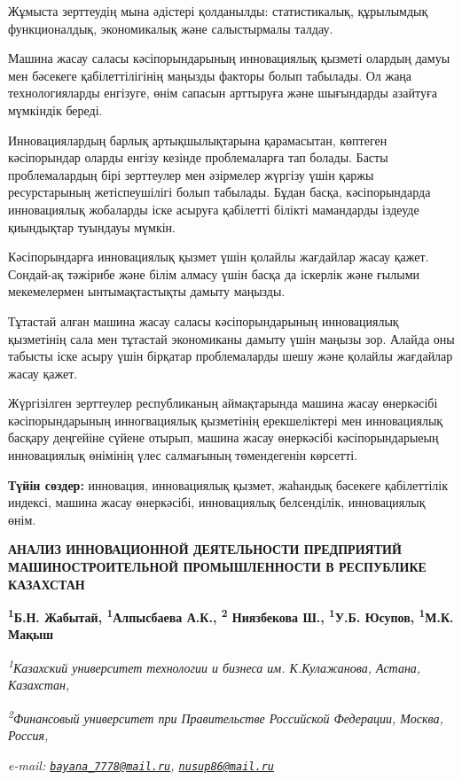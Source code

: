 Жұмыста зерттеудің мына әдістері қолданылды: статистикалық, құрылымдық
функционалдық, экономикалық және салыстырмалы талдау.

Машина жасау саласы кәсіпорындарының инновациялық қызметі олардың дамуы
мен бәсекеге қабілеттілігінің маңызды факторы болып табылады. Ол жаңа
технологияларды енгізуге, өнім сапасын арттыруға және шығындарды
азайтуға мүмкіндік береді.

Инновациялардың барлық артықшылықтарына қарамасытан, көптеген
кәсіпорындар оларды енгізу кезінде проблемаларға тап болады. Басты
проблемалардың бірі зерттеулер мен әзірмелер жүргізу үшін қаржы
ресурстарының жетіспеушілігі болып табылады. Бұдан басқа, кәсіпорындарда
инновациялық жобаларды іске асыруға қабілетті білікті мамандарды іздеуде
қиындықтар туындауы мүмкін.

Кәсіпорындарға инновациялық қызмет үшін қолайлы жағдайлар жасау қажет.
Сондай-ақ тәжірибе және білім алмасу үшін басқа да іскерлік және ғылыми
мекемелермен ынтымақтастықты дамыту маңызды.

Тұтастай алған машина жасау саласы кәсіпорындарының инновациялық
қызметінің сала мен тұтастай экономиканы дамыту үшін маңызы зор. Алайда
оны табысты іске асыру үшін бірқатар проблемаларды шешу және қолайлы
жағдайлар жасау қажет.

Жүргізілген зерттеулер республиканың аймақтарында машина жасау
өнеркәсібі кәсіпорындарының инногвациялық қызметінің ерекшеліктері мен
инновациялық басқару деңгейіне сүйене отырып, машина жасау өнеркәсібі
кәсіпорындарыеың инновациялық өнімінің үлес салмағының төмендегенін
көрсетті.

{\bfseries Түйін сөздер:} инновация, инновациялық қызмет, жаһандық бәсекеге
қабілеттілік индексі, машина жасау өнеркәсібі, инновациялық белсенділік,
инновациялық өнім.

\begin{articleheader}
{\bfseries АНАЛИЗ ИННОВАЦИОННОЙ ДЕЯТЕЛЬНОСТИ ПРЕДПРИЯТИЙ МАШИНОСТРОИТЕЛЬНОЙ
ПРОМЫШЛЕННОСТИ В РЕСПУБЛИКЕ КАЗАХСТАН}

{\bfseries
\textsuperscript{1}Б.Н. Жабытай\textsuperscript{\envelope },
\textsuperscript{1}Алпысбаева А.К.,
\textsuperscript{2} Ниязбекова Ш.,
\textsuperscript{1}У.Б. Юсупов\textsuperscript{\envelope },
\textsuperscript{1}М.К. Мақыш}
\end{articleheader}

\begin{affiliation}
\emph{\textsuperscript{1}Казахский университет технологии и бизнеса им. К.Кулажанова, Астана, Казахстан,}

\emph{\textsuperscript{2}Финансовый университет при Правительстве Российской Федерации, Москва, Россия,}

\emph{e-mail: \href{mailto:bayana_7778@mail.ru}{\nolinkurl{bayana\_7778@mail.ru}}, \href{mailto:nusup86@mail.ru}{\nolinkurl{nusup86@mail.ru}}}
\end{affiliation}

